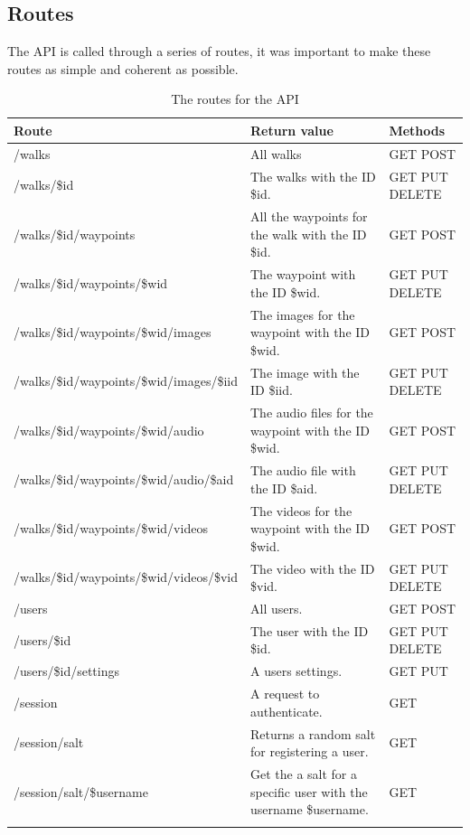 \documentclass[11pt,a4paper]{article}
\begin{document}
\subsection{Routes}

The API is called through a series of routes, it was important to make these routes as simple and coherent as possible.

\begin{longtable}{m{}|m{}|C{0.11\textwidth}}
    \textbf{Route} & \textbf{Return value} & \textbf{Methods} \\\hline
    /walks & All walks & GET POST\\ \hline
    /walks/\$id & The walks with the ID \$id. & GET PUT DELETE\\ \hline
    /walks/\$id/waypoints & All the waypoints for the walk with the ID \$id. & GET POST\\ \hline
    /walks/\$id/waypoints/\$wid & The waypoint with the ID \$wid. & GET PUT DELETE \\ \hline
    /walks/\$id/waypoints/\$wid/images & The images for the waypoint with the ID \$wid. & GET POST \\ \hline
    /walks/\$id/waypoints/\$wid/images/\$iid & The image with the ID \$iid. & GET PUT DELETE \\ \hline
    /walks/\$id/waypoints/\$wid/audio & The audio files for the waypoint with the ID \$wid. & GET POST \\ \hline
    /walks/\$id/waypoints/\$wid/audio/\$aid & The audio file with the ID \$aid. & GET PUT DELETE \\ \hline
    /walks/\$id/waypoints/\$wid/videos & The videos for the waypoint with the ID \$wid. & GET POST \\ \hline
    /walks/\$id/waypoints/\$wid/videos/\$vid & The video with the ID \$vid. & GET PUT DELETE \\ \hline
    /users & All users. & GET POST \\\hline
    /users/\$id & The user with the ID \$id. & GET PUT DELETE \\\hline
    /users/\$id/settings & A users settings. & GET PUT \\\hline
    /session & A request to authenticate. & GET\\\hline
    /session/salt & Returns a random salt for registering a user. & GET\\\hline
    /session/salt/\$username & Get the a salt for a specific user with the username \$username. & GET\\
    \caption {The routes for the API}
    \label{routes}
\end{longtable}
\end{document}

